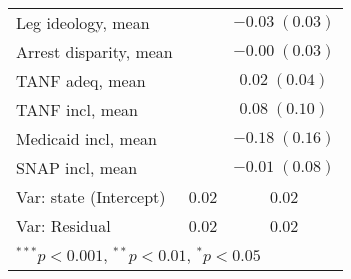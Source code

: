 \begin{table}
\begin{center}
\begin{tabular}{l c c }
Leg ideology, mean         &                         & $-0.03 \; (0.03)$       \\
Arrest disparity, mean     &                         & $-0.00 \; (0.03)$       \\
TANF adeq, mean            &                         & $0.02 \; (0.04)$        \\
TANF incl, mean            &                         & $0.08 \; (0.10)$        \\
Medicaid incl, mean        &                         & $-0.18 \; (0.16)$       \\
SNAP incl, mean            &                         & $-0.01 \; (0.08)$       \\
\hline
Var: state (Intercept)     & 0.02                    & 0.02                    \\
Var: Residual              & 0.02                    & 0.02                    \\
\hline
\multicolumn{3}{l}{\scriptsize{$^{***}p<0.001$, $^{**}p<0.01$, $^*p<0.05$}}
\end{tabular}
\label{table:coefficients}
\end{center}
\end{table}
